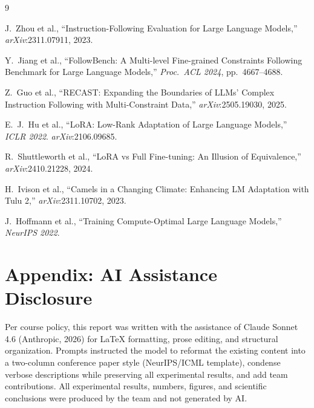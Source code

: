 \documentclass[10pt]{article}
\begin{document}
\begin{thebibliography}{9}

J.~Zhou et al.,
``Instruction-Following Evaluation for Large Language Models,''
\textit{arXiv}:2311.07911, 2023.

Y.~Jiang et al.,
``FollowBench: A Multi-level Fine-grained Constraints Following Benchmark
for Large Language Models,''
\textit{Proc.\ ACL 2024}, pp.\ 4667--4688.

Z.~Guo et al.,
``RECAST: Expanding the Boundaries of LLMs' Complex Instruction Following
with Multi-Constraint Data,''
\textit{arXiv}:2505.19030, 2025.

E.~J.~Hu et al.,
``LoRA: Low-Rank Adaptation of Large Language Models,''
\textit{ICLR 2022}. \textit{arXiv}:2106.09685.

R.~Shuttleworth et al.,
``LoRA vs Full Fine-tuning: An Illusion of Equivalence,''
\textit{arXiv}:2410.21228, 2024.

H.~Ivison et al.,
``Camels in a Changing Climate: Enhancing LM Adaptation with Tulu 2,''
\textit{arXiv}:2311.10702, 2023.

J.~Hoffmann et al.,
``Training Compute-Optimal Large Language Models,''
\textit{NeurIPS 2022}.

\end{thebibliography}

\appendix
\section*{Appendix: AI Assistance Disclosure}

Per course policy, this report was written with the assistance of Claude
Sonnet 4.6 (Anthropic, 2026) for LaTeX formatting, prose editing, and
structural organization. Prompts instructed the model to reformat the
existing content into a two-column conference paper style (NeurIPS/ICML
template), condense verbose descriptions while preserving all experimental
results, and add team contributions. All experimental results, numbers,
figures, and scientific conclusions were produced by the team and not
generated by AI.
\end{document}
